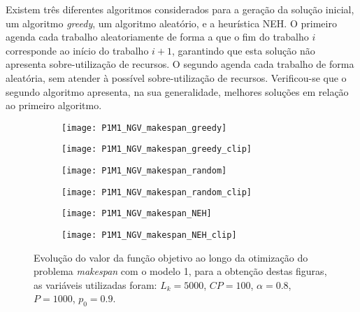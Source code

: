 Existem três diferentes algoritmos considerados para a geração da solução inicial, um algoritmo \textit{greedy}, um algoritmo aleatório, e a heurística NEH. O primeiro agenda cada trabalho aleatoriamente de forma a que o fim do trabalho $i$ corresponde ao início do trabalho $i+1$, garantindo que esta solução não apresenta sobre-utilização de recursos. O segundo agenda cada trabalho de forma aleatória, sem atender à possível sobre-utilização de recursos. Verificou-se que o segundo algoritmo apresenta, na sua generalidade, melhores soluções em relação ao primeiro algoritmo.\\
\begin{figure}[h]
    \centering
    \begin{subfigure}{0.49\textwidth}
        \centering
        \texttt{[image: P1M1\_NGV\_makespan\_greedy]}
        \caption{}
        \label{fig:P1M1_NGV_makespan_greedy}
    \end{subfigure}
    \hfill
    \begin{subfigure}{0.49\textwidth}
        \centering
        \texttt{[image: P1M1\_NGV\_makespan\_greedy\_clip]}
        \caption{}
        \label{fig:P1M1_NGV_makespan_greedy_clip}
    \end{subfigure}
    
    \begin{subfigure}{0.49\textwidth}
        \centering
        \texttt{[image: P1M1\_NGV\_makespan\_random]}
        \caption{}
        \label{fig:P1M1_NGV_makespan_random}
    \end{subfigure}
    \hfill
    \begin{subfigure}{0.49\textwidth}
        \centering
        \texttt{[image: P1M1\_NGV\_makespan\_random\_clip]}
        \caption{}
        \label{fig:P1M1_NGV_makespan_random_clip}
    \end{subfigure}
    
    \begin{subfigure}{0.49\textwidth}
        \centering
        \texttt{[image: P1M1\_NGV\_makespan\_NEH]}
        \caption{}
        \label{fig:P1M1_NGV_makespan_NEH}
    \end{subfigure}
    \hfill
    \begin{subfigure}{0.49\textwidth}
        \centering
        \texttt{[image: P1M1\_NGV\_makespan\_NEH\_clip]}
        \caption{}
        \label{fig:P1M1_NGV_makespan_NEH_clip}
    \end{subfigure}
    \caption{Evolução do valor da função objetivo ao longo da otimização do problema \textit{makespan} com o modelo 1, para a obtenção destas figuras, as variáveis utilizadas foram: $L_{k}=5000$, $CP=100$, $\alpha=0.8$, $P=1000$, $p_{0}=0.9$.}
    \label{fig:P1M1_NGV_dif_sol_ini}
\end{figure}
